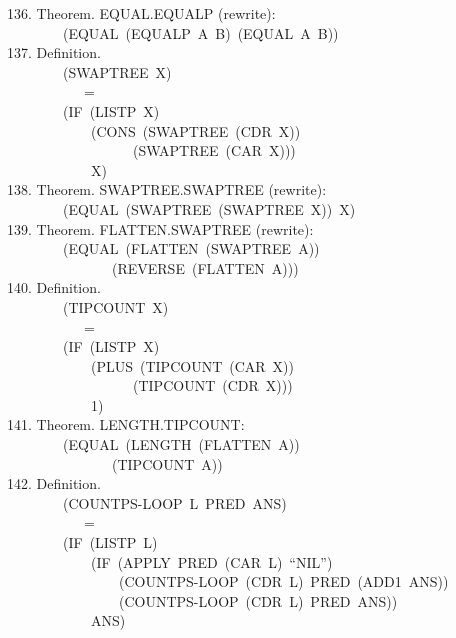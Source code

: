 \documentclass[10pt]{book}
\newenvironment{pubasis}{\begin{flushleft}}{\end{flushleft}}
\begin{document}
\begin{pubasis}
136.    Theorem.  EQUAL.EQUALP (rewrite):\\
~~~~~~~~(EQUAL~(EQUALP~A~B)~(EQUAL~A~B))\\

137.    Definition.\\
~~~~~~~~(SWAPTREE~X)\\
~~~~~~~~~~~=\\
~~~~~~~~(IF~(LISTP~X)\\
~~~~~~~~~~~~(CONS~(SWAPTREE~(CDR~X))\\
~~~~~~~~~~~~~~~~~~(SWAPTREE~(CAR~X)))\\
~~~~~~~~~~~~X)\\

138.    Theorem.  SWAPTREE.SWAPTREE (rewrite):\\
~~~~~~~~(EQUAL~(SWAPTREE~(SWAPTREE~X))~X)\\

139.    Theorem.  FLATTEN.SWAPTREE (rewrite):\\
~~~~~~~~(EQUAL~(FLATTEN~(SWAPTREE~A))\\
~~~~~~~~~~~~~~~(REVERSE~(FLATTEN~A)))\\

140.    Definition.\\
~~~~~~~~(TIPCOUNT~X)\\
~~~~~~~~~~~=\\
~~~~~~~~(IF~(LISTP~X)\\
~~~~~~~~~~~~(PLUS~(TIPCOUNT~(CAR~X))\\
~~~~~~~~~~~~~~~~~~(TIPCOUNT~(CDR~X)))\\
~~~~~~~~~~~~1)\\

141.    Theorem.  LENGTH.TIPCOUNT:\\
~~~~~~~~(EQUAL~(LENGTH~(FLATTEN~A))\\
~~~~~~~~~~~~~~~(TIPCOUNT~A))\\

142.    Definition.\\
~~~~~~~~(COUNTPS-LOOP~L~PRED~ANS)\\
~~~~~~~~~~~=\\
~~~~~~~~(IF~(LISTP~L)\\
~~~~~~~~~~~~(IF~(APPLY~PRED~(CAR~L)~``NIL'')\\
~~~~~~~~~~~~~~~~(COUNTPS-LOOP~(CDR~L)~PRED~(ADD1~ANS))\\
~~~~~~~~~~~~~~~~(COUNTPS-LOOP~(CDR~L)~PRED~ANS))\\
~~~~~~~~~~~~ANS)\\


\end{pubasis}
\end{document}
